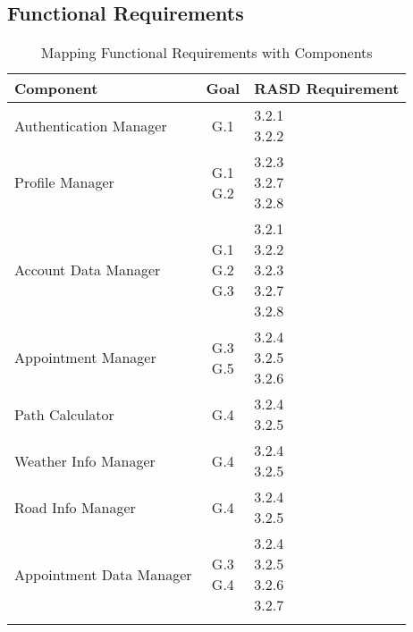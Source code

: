 \subsection{Functional Requirements}

\begin{longtable}{|l|c|l|}
	\hline
	\label{tab:traceabilityrequirements}
	\textbf{Component} & \textbf{Goal} & \textbf{RASD Requirement}\\
	\hline
	Authentication Manager & G.1 & \makecell{3.2.1 \\ 3.2.2}\\
	\hline
	Profile Manager & \makecell{G.1\\G.2} & \makecell{3.2.3\\3.2.7\\3.2.8}\\
	\hline
	Account Data Manager & \makecell{G.1\\G.2\\G.3} & \makecell{3.2.1\\3.2.2\\3.2.3\\3.2.7\\3.2.8}\\
	\hline
	Appointment Manager & \makecell{G.3\\G.5} & \makecell{3.2.4\\3.2.5\\3.2.6}\\
	\hline
	Path Calculator & G.4 & \makecell{3.2.4\\3.2.5}\\
	\hline
	Weather Info Manager & G.4 & \makecell{3.2.4\\3.2.5}\\
	\hline
	Road Info Manager & G.4 & \makecell{3.2.4\\3.2.5}\\
	\hline
	Appointment Data Manager & \makecell{G.3\\G.4} & \makecell{3.2.4\\3.2.5\\3.2.6\\3.2.7}\\
	\hline	
	\caption{Mapping Functional Requirements with Components}
\end{longtable}
